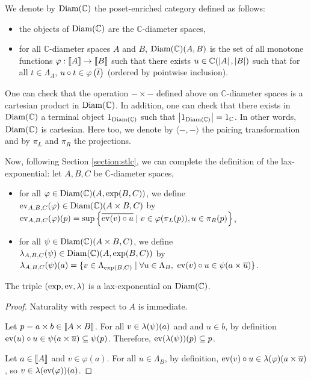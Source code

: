 \begin{definition}
We denote by $\operatorname{Diam}(\mathbb{C})$ the poset-enriched category defined as follows: \begin{itemize}
\item the objects of $\operatorname{Diam}(\mathbb{C})$ are the $\mathbb{C}$-diameter spaces,
\item for all $\mathbb{C}$-diameter spaces $A$ and $B$, $\operatorname{Diam}(\mathbb{C})(A,B)$ is the set of all monotone functions $\varphi : \llbracket A \rrbracket \to \llbracket B \rrbracket$ such that there exists $u \in \mathbb{C}(\left\vert A\right\vert,\left\vert B\right\vert)$ such that for all $t \in \Lambda_A$, $u \circ t \in \varphi\left(\overline{t}\right)$ (ordered by pointwise inclusion).
\end{itemize}
\end{definition}

One can check that the operation $-\times-$ defined above on $\mathbb{C}$-diameter spaces is a cartesian product in $\operatorname{Diam}(\mathbb{C})$. In addition, one can check that there exists in $\operatorname{Diam}(\mathbb{C})$ a terminal object $1_{\operatorname{Diam}(\mathbb{C})}$ such that $\left\vert1_{\operatorname{Diam}(\mathbb{C})}\right\vert = 1_{\mathbb{C}}$. In other words, $\operatorname{Diam}(\mathbb{C})$ is cartesian. Here too, we denote by $\langle-,-\rangle$ the pairing transformation and by $\pi_L$ and $\pi_R$ the projections.


Now, following Section \ref{section:stlc}, we can complete the definition of the lax-exponential: let $A,B,C$ be $\mathbb{C}$-diameter spaces, \begin{itemize}
\item for all $\varphi \in \operatorname{Diam}(\mathbb{C})(A, \exp(B, C))$, we define $\operatorname{ev}_{A,B,C}(\varphi) \in \operatorname{Diam}(\mathbb{C})\allowbreak(A \times B, C)$ by $\operatorname{ev}_{A,B,C}(\varphi)(p) = \sup\left\{ \overline{\operatorname{ev}(v) \circ u} \mid v \in \varphi(\pi_L(p)), u \in \pi_R(p) \right\}$,
\item for all $\psi \in \operatorname{Diam}(\mathbb{C})(A \times B, C)$, we define $\lambda_{A,B,C}(\psi) \in \operatorname{Diam}(\mathbb{C})(A,\allowbreak \exp(B, C))$ by $\lambda_{A,B,C}(\psi)(a) = \{ v \in \Lambda_{\exp(B, C)} \mid \forall u \in \Lambda_B,~ \operatorname{ev}(v) \circ u \in \psi(a \times \overline{u}) \}$.
\end{itemize}
 
 \begin{proposition} The triple $(\exp, \operatorname{ev}, \lambda)$ is a lax-exponential on $\operatorname{Diam}(\mathbb{C})$.
 \end{proposition}
 \begin{proof} Naturality with respect to $A$ is immediate.
 
Let $p = a \times b \in \llbracket A \times B \rrbracket$. For all $v \in \lambda(\psi)(a)$ and and $u \in b$, by definition $\operatorname{ev}(u) \circ u \in \psi(a \times \overline{u}) \subseteq \psi(p)$. Therefore, $\operatorname{ev}(\lambda(\psi))(p) \subseteq p$.
 
 Let $a \in \llbracket A \rrbracket$ and $v \in \varphi(a)$. For all $u \in \Lambda_B$,  by definition, $\operatorname{ev}(v) \circ u \in \lambda(\varphi)(a \times \overline{u})$, so $v \in \lambda(\operatorname{ev}(\varphi))(a)$.
\end{proof}
 

